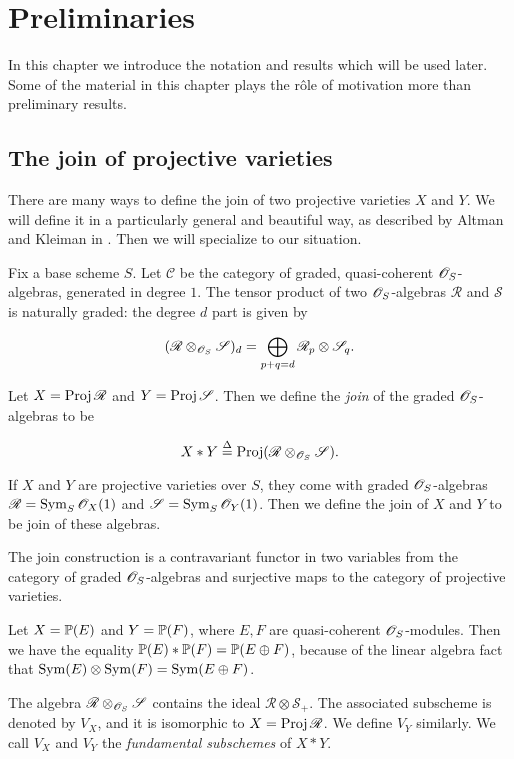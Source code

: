 \chapter{Preliminaries}
\label{sec:prelims}

In this chapter we introduce the notation and results which will be used later. Some of the material in this chapter plays the rôle of motivation more than preliminary results.

\section{The join of projective varieties}

There are many ways to define the join of two projective varieties $X$ and $Y$. We will define it in a particularly general and beautiful  way, as described by Altman and Kleiman in \cite{altman_joins}. Then we will specialize to our situation.

Fix a base scheme $S$. Let $\mathscr C$ be the category of graded, quasi-coherent $\OO_S$-algebras, generated in degree $1$. The tensor product of two $\OO_S$-algebras $\mathscr R$ and $\mathscr S$  is naturally graded: the degree $d$ part is given by

\[
(\mathscr R \otimes_{\OO_S} \mathscr S)_d = \bigoplus_{p+q=d} \mathscr R_p \otimes \mathscr S_q.
\]

Let $X=\Proj \mathscr R$ and $Y = \Proj \mathscr S$. Then we define the \emph{join} of the graded $\OO_S$-algebras to be

\[
X \ast Y \stackrel \Delta =  \Proj (\mathscr R \otimes_{\OO_S} \mathscr S).
\]

If $X$ and $Y$ are projective varieties over $S$, they come with graded $\OO_S$-algebras $\mathscr R = \Sym_S \OO_X(1)$ and $\mathscr S = \Sym_S \OO_Y(1)$. Then we define the join of $X$ and $Y$ to be join of these algebras.

The join construction is a contravariant functor in two variables from the category of graded $\OO_S$-algebras and surjective maps to the category of projective varieties.

\begin{example}
Let $X=\P(E)$ and $Y=\P(F)$, where $E,F$ are quasi-coherent $\OO_S$-modules. Then we have the equality $\P(E) \ast \P(F) = \P(E \oplus F)$, because of the linear algebra fact that $\Sym(E) \otimes \Sym(F) = \Sym(E \oplus F)$.
\end{example}

The algebra $\mathscr R \otimes_{\OO_S} \mathscr S$ contains the ideal $\mathscr R \otimes \mathscr S_+$. The associated subscheme is denoted by $V_X$, and it is isomorphic to $X = \Proj \mathscr R$. We define $V_Y$ similarly. We call $V_X$ and $V_Y$ the \emph{fundamental subschemes} of $X \ast Y$.

